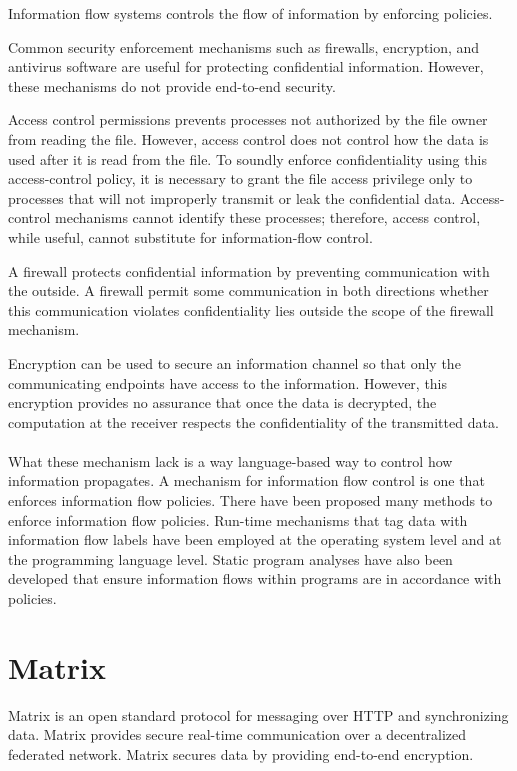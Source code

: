 Information flow systems controls the flow of information by enforcing policies. 


Common security enforcement mechanisms such as
firewalls, encryption, and antivirus software are useful for protecting
confidential information. However, these mechanisms
do not provide end-to-end security.

Access control permissions prevents processes not authorized by the file owner from reading the file. However, access control does not control how
the data is used after it is read from the file.
To soundly enforce confidentiality using this access-control policy, it is necessary to grant the file access privilege only to processes that will not improperly transmit or leak the confidential data.
Access-control mechanisms cannot identify these processes; therefore, access control, while useful, cannot substitute for information-flow control.

A firewall protects confidential information by preventing communication with the outside. A firewall permit some communication in both directions whether this communication violates confidentiality lies outside the scope of the firewall mechanism. 

Encryption can be used to secure an information channel so that only the communicating endpoints have access to the information. However, this encryption provides no assurance that once the data is decrypted, the computation at the receiver respects the confidentiality of the transmitted data.
\\
\\
What these mechanism lack is a way language-based way to control how information propagates. A mechanism for information flow control is one that enforces information flow policies. There have been proposed many methods to enforce information flow policies. Run-time mechanisms that tag data with information flow labels have been employed at the operating system level and at the programming language level. Static program analyses have also been developed that ensure information flows within programs are in accordance with policies. 



\section{Matrix}\label{matrix:intro}
Matrix is an open standard protocol for messaging over HTTP and synchronizing data. Matrix provides secure real-time communication over a decentralized federated network. Matrix secures data by providing end-to-end encryption. 

